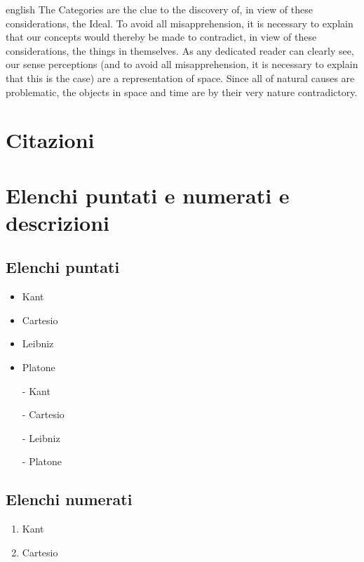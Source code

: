  \begin{otherlanguage*}{english}
The Categories are the clue to the discovery of, in view of these considerations, the Ideal. To avoid all misapprehension, it is necessary to explain that our concepts would thereby be made to contradict, in view of these considerations, the things in themselves. As any dedicated reader can clearly see, our sense perceptions (and to avoid all misapprehension, it is necessary to explain that this is the case) are a representation of space. Since all of natural causes are problematic, the objects in space and time are by their very nature contradictory.
\end{otherlanguage*}


\section{Citazioni}

\cite{Ethica,Bringhurst:1996,Descartes:1897,Facchinetti:2009a,Galilei1,kant:kpv}

\section{Elenchi puntati e numerati e descrizioni}\label{sec:elenchi}


\subsection{Elenchi puntati}
\begin{itemize} 
\item Kant
\item Cartesio
\item Leibniz
\item Platone
\end{itemize}

 \begin{itemize}
 \item[-] Kant
 \item[-] Cartesio
 \item[-] Leibniz
 \item[-] Platone
 \end{itemize}

\subsection{Elenchi numerati}
\begin{enumerate}
 \item Kant
 \item Cartesio
 \end{enumerate}
 
